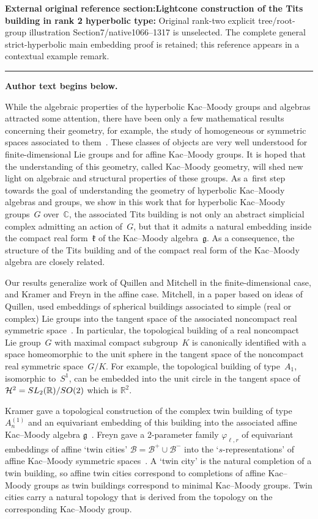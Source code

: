 \documentclass[11pt]{article}
\numberwithin{equation}{section}
\numberwithin{equation}{section}
\def\C{{\mathbb C}}
\def\R{\mathbb{R}}
\def\cB{\mathcal B}
\def\g{\mathfrak{g}}
\def\fg{\mathfrak{g}}
\def\k{\mathfrak{k}}
\begin{document}
\noindent\textbf{External original reference section:Lightcone construction of the Tits building in rank 2 hyperbolic type:} Original rank-two explicit tree/root-group illustration Section7/native1066–1317 is unselected. The complete general strict-hyperbolic main embedding proof is retained; this reference appears in a contextual example remark.\par
\medskip\hrule\medskip\noindent\textbf{Author text begins below.}\par
\setcounter{section}{1}
 While the algebraic properties of the hyperbolic Kac--Moody groups and algebras attracted some attention, there have been only a few mathematical results concerning their geometry, for example, the study of homogeneous or symmetric spaces associated to them~\cite{FreynHartnickHornKoehl17}.
These classes of objects are very well understood for finite-dimensional Lie groups and for affine Kac--Moody groups. It is hoped that the understanding of this geometry, called Kac--Moody geometry, will shed new light on algebraic and structural properties of these groups. As a~first step towards the goal of understanding the geometry of hyperbolic Kac--Moody algebras and groups, we show in this work that for
hyperbolic Kac--Moody groups~$G$ over~$\C$, the associated Tits building is not only an abstract simplicial complex admitting an action of~$G$, but that it admits a natural embedding inside the compact real form~$\k$ of the Kac--Moody algebra~$\fg$. As a consequence, the structure of the Tits building and of the compact real form of the Kac--Moody algebra are closely related.

Our results generalize work of Quillen and Mitchell in the finite-dimensional case, and Kramer and Freyn in the affine case. Mitchell, in a paper based on ideas of Quillen, used embeddings of spherical buildings associated to simple (real or complex) Lie groups into the tangent space of
the associated noncompact real symmetric space~\cite{Mitchell88}. In particular, the topological building of a real noncompact Lie group~$G$ with maximal compact subgroup~$K$ is canonically identified with a space homeomorphic to the unit sphere in the tangent space of the noncompact real symmetric space~$G/K$. For example, the topological building of type~$A_1$, isomorphic to~$S^1$, can be embedded into the unit circle in the tangent space of $\mathcal{H}^2={\rm SL}_2(\R)/{\rm SO}(2)$ which is $\R^2$.

Kramer gave a topological construction of the complex twin building of type $A_n^{(1)}$ and an equivariant embedding of this building into the associated affine Kac--Moody algebra $\g$~\cite{Kramer02}.
Freyn gave a 2-parameter family $\varphi_{\ell,r}$ of equivariant embeddings of affine `twin cities' \mbox{$\cB \!=\! \cB^+\!\cup\! \cB^-$} into the `$s$-representations' of affine Kac--Moody symmetric spaces~\cite{Freyn09, Freyn10b, Freyn10d, Freyn14, Freyn15b}. A `twin city' is the natural completion of a twin building, so affine twin cities correspond to completions of affine Kac--Moody groups as twin buildings correspond to minimal Kac--Moody groups. Twin cities carry a natural topology that is derived from the topology on the corresponding Kac--Moody group.
\end{document}
